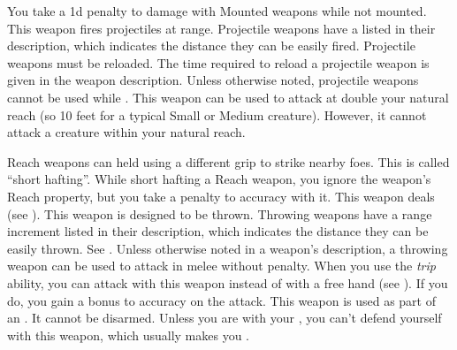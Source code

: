         You take a \minus1d penalty to damage with Mounted weapons while not mounted.
         This weapon fires projectiles at range. Projectile weapons have a  listed in their description, which indicates the distance they can be easily fired. Projectile weapons must be reloaded. The time required to reload a projectile weapon is given in the weapon description.
        Unless otherwise noted, projectile weapons cannot be used while \prone.
        \label{Reach Weapon} This weapon can be used to attack at double your natural reach (so 10 feet for a typical Small or Medium creature). However, it cannot attack a creature within your natural reach.

        Reach weapons can held using a different grip to strike nearby foes. This is called ``short hafting''. While short hafting a Reach weapon, you ignore the weapon's Reach property, but you take a  penalty to accuracy with it.
         This weapon deals  (see ).
         This weapon is designed to be thrown. Throwing weapons have a range increment listed in their description, which indicates the distance they can be easily thrown. See .
        Unless otherwise noted in a weapon's description, a throwing weapon can be used to attack in melee without penalty.
         When you use the \textit{trip} ability, you can attack with this weapon instead of with a free hand (see ).
        If you do, you gain a  bonus to accuracy on the attack.
         This weapon is used as part of an .
        It cannot be disarmed.
        Unless you are  with your , you can't defend yourself with this weapon, which usually makes you .

